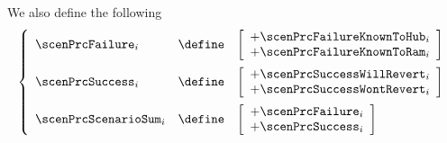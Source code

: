 We also define the following
\[
	\left\{ \begin{array}{lcl}
		\scenPrcFailure _{i} & \define &
		\left[ \begin{array}{l}
			+ \scenPrcFailureKnownToHub _{i} \\
			+ \scenPrcFailureKnownToRam _{i} \\
		\end{array} \right] \vspace{2mm} \\
		\scenPrcSuccess _{i} & \define &
		\left[ \begin{array}{l}
			+ \scenPrcSuccessWillRevert _{i} \\
			+ \scenPrcSuccessWontRevert _{i} \\
		\end{array} \right] \vspace{2mm} \\
		\scenPrcScenarioSum _{i} & \define & 
		\left[ \begin{array}{l}
			+ \scenPrcFailure _{i} \\
			+ \scenPrcSuccess _{i} \\
		\end{array} \right]
	\end{array} \right.
\]
